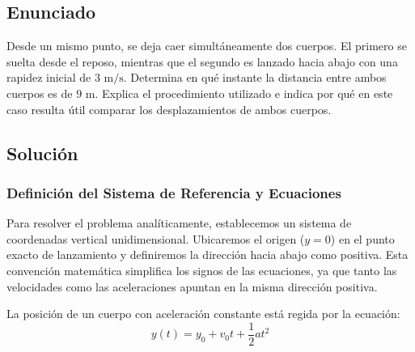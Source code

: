 \documentclass[12pt, a4paper]{article}
\begin{document}
\newpage

\subsection*{Enunciado}

Desde un mismo punto, se deja caer simultáneamente dos cuerpos. El primero se suelta desde el reposo, mientras que el segundo es lanzado hacia abajo con una rapidez inicial de $3 \text{ m/s}$. Determina en qué instante la distancia entre ambos cuerpos es de $9 \text{ m}$. Explica el procedimiento utilizado e indica por qué en este caso resulta útil comparar los desplazamientos de ambos cuerpos.

\vspace{0.5cm}

\begin{center}
\end{center}

\subsection*{Solución}

\subsubsection*{Definición del Sistema de Referencia y Ecuaciones}

Para resolver el problema analíticamente, establecemos un sistema de coordenadas vertical unidimensional. Ubicaremos el origen ($y = 0$) en el punto exacto de lanzamiento y definiremos la dirección hacia abajo como positiva. Esta convención matemática simplifica los signos de las ecuaciones, ya que tanto las velocidades como las aceleraciones apuntan en la misma dirección positiva.

La posición de un cuerpo con aceleración constante está regida por la ecuación:
\begin{equation}
y(t) = y_0 + v_0 t + \frac{1}{2} a t^2
\end{equation}
\end{document}
